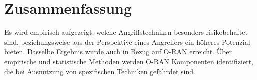 \chapter{Zusammenfassung}
\label{chap:zusammenfassung}

Es wird empirisch aufgezeigt, welche Angriffstechniken besonders risikobehaftet sind, beziehungsweise aus der Perspektive eines Angreifers ein höheres Potenzial bieten. 
Dasselbe Ergebnis wurde auch in Bezug auf O-RAN erreicht. Über empirische und statistische Methoden werden O-RAN Komponenten identifiziert, die bei Ausnutzung von spezifischen Techniken gefährdet sind.
